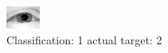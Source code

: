 \begin{figure}[h!]
\begin{center}
\includegraphics[width=0.60\columnwidth]{figures/ID2363_class_1_target_2.png}
\end{center}
\caption{ Classification: 1 actual target: 2}
\label{fig:ID2363_class_1_target_2}
\end{figure}
